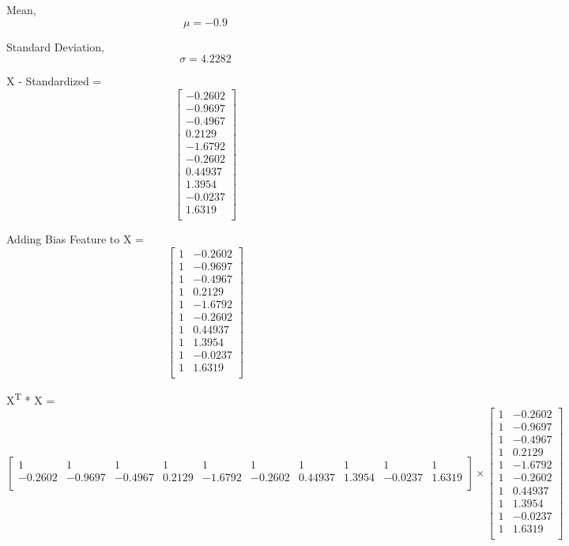 \documentclass{report}
\begin{document}
\begin{flushleft}
Mean, 
\begin{equation}
\mu = -0.9
\end{equation}

Standard Deviation,
\begin{equation}
\sigma = 4.2282
\end{equation}

X - Standardized =
\[
\begin{bmatrix}
-0.2602 \\
-0.9697 \\
-0.4967 \\
0.2129 \\
-1.6792 \\
-0.2602 \\
0.44937 \\
1.3954 \\
-0.0237 \\
1.6319 \\
\end{bmatrix}
\] \linebreak[2]

Adding Bias Feature to X = 
\[
\begin{bmatrix}
1 & -0.2602 \\
1& -0.9697 \\
1 & -0.4967 \\
1 & 0.2129 \\
1 & -1.6792 \\
1 & -0.2602 \\
1 & 0.44937 \\
1 & 1.3954 \\
1 & -0.0237 \\
1 & 1.6319 \\
\end{bmatrix}
\] \linebreak[2]

X\textsuperscript{T} * X = 
\[\begin{bmatrix}
1 & 
1 & 
1 & 
1 & 
1 & 
1 & 
1 & 
1 & 
1 & 
1 \\
-0.2602 &
-0.9697 &
-0.4967 &
0.2129 &
-1.6792 &
-0.2602 &
0.44937 &
1.3954 &
-0.0237 &
1.6319 \\
\end{bmatrix}
\times
\begin{bmatrix}
1 & -0.2602 \\
1 & -0.9697 \\
1 & -0.4967 \\
1 & 0.2129 \\
1 & -1.6792 \\
1 & -0.2602 \\
1 & 0.44937 \\
1 & 1.3954 \\
1 & -0.0237 \\
1 & 1.6319 \\
\end{bmatrix}
\] 



\end{flushleft}
\end{document}

